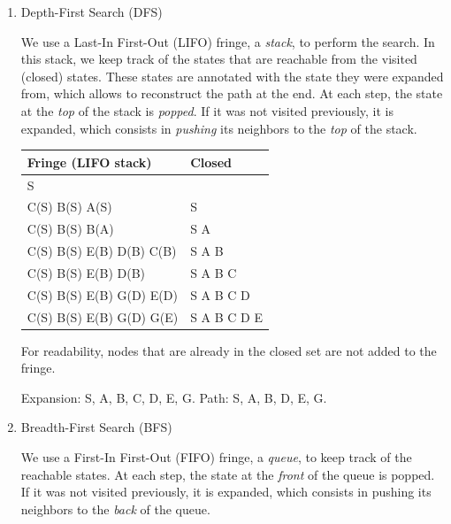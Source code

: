 \documentclass[11pt, a4paper]{article}
\begin{document}
\begin{enumerate}
    \item Depth-First Search (DFS)

    \begin{solution}
        We use a Last-In First-Out (LIFO) fringe, \ie{} a \emph{stack}, to perform the search. In this stack, we keep track of the states that are reachable from the visited (closed) states. These states are annotated with the state they were expanded from, which allows to reconstruct the path at the end. At each step, the state at the \emph{top} of the stack is \emph{popped}. If it was not visited previously, it is expanded, which consists in \emph{pushing} its neighbors to the \emph{top} of the stack.

        \begin{table}[H]
            \centering
            \begin{tabular}{l|l}
                \toprule
                Fringe (LIFO stack) & Closed \\
                \midrule
                S & \\
                C(S) B(S) A(S) & S \\
                C(S) B(S) B(A) & S A \\
                C(S) B(S) E(B) D(B) C(B) & S A B \\
                C(S) B(S) E(B) D(B) & S A B C \\
                C(S) B(S) E(B) G(D) E(D) & S A B C D \\
                C(S) B(S) E(B) G(D) G(E) & S A B C D E \\
                \bottomrule
            \end{tabular}
        \end{table}

        For readability, nodes that are already in the closed set are not added to the fringe.

        Expansion: S, A, B, C, D, E, G. Path: S, A, B, D, E, G.
    \end{solution}

    \item Breadth-First Search (BFS)

    \begin{solution}
        We use a First-In First-Out (FIFO) fringe, \ie{} a \emph{queue}, to keep track of the reachable states. At each step, the state at the \emph{front} of the queue is popped. If it was not visited previously, it is expanded, which consists in pushing its neighbors to the \emph{back} of the queue.


\end{solution}
\end{enumerate}
\end{document}
